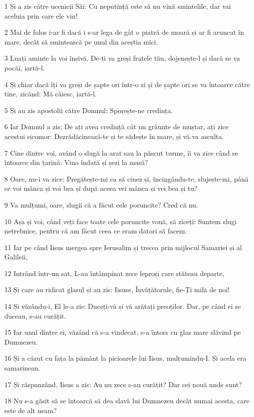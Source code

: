\par 1 Și a zis către ucenicii Săi: Cu neputință este să nu vină smintelile, dar vai aceluia prin care ele vin!
\par 2 Mai de folos i-ar fi dacă i s-ar lega de gât o piatră de moară și ar fi aruncat în mare, decât să smintească pe unul din aceștia mici.
\par 3 Luați aminte la voi înșivă. De-ți va greși fratele tău, dojenește-l și dacă se va pocăi, iartă-l.
\par 4 Și chiar dacă îți va greși de șapte ori într-o zi și de șapte ori se va întoarce către tine, zicând: Mă căiesc, iartă-l.
\par 5 Și au zis apostolii către Domnul: Sporește-ne credința.
\par 6 Iar Domnul a zis: De ați avea credință cât un grăunte de muștar, ați zice acestui sicomor: Dezrădăcinează-te și te sădește în mare, și vă va asculta.
\par 7 Cine dintre voi, având o slugă la arat sau la păscut turme, îi va zice când se întoarce din țarină: Vino îndată și șezi la masă?
\par 8 Oare, nu-i va zice: Pregătește-mi ca să cinez și, încingându-te, slujește-mi, până ce voi mânca și voi bea și după aceea vei mânca și vei bea și tu?
\par 9 Va mulțumi, oare, slugii că a făcut cele poruncite? Cred că nu.
\par 10 Așa și voi, când veți face toate cele poruncite vouă, să ziceți: Suntem slugi netrebnice, pentru că am făcut ceea ce eram datori să facem.
\par 11 Iar pe când Iisus mergea spre Ierusalim și trecea prin mijlocul Samariei și al Galileii,
\par 12 Intrând într-un sat, L-au întâmpinat zece leproși care stăteau departe,
\par 13 Și care au ridicat glasul și au zis: Iisuse, Învățătorule, fie-Ți milă de noi!
\par 14 Și văzându-i, El le-a zis: Duceți-vă și vă arătați preoților. Dar, pe când ei se duceau, s-au curățit.
\par 15 Iar unul dintre ei, văzând că s-a vindecat, s-a întors cu glas mare slăvind pe Dumnezeu.
\par 16 Și a căzut cu fața la pământ la picioarele lui Iisus, mulțumindu-I. Și acela era samarinean.
\par 17 Și răspunzând, Iisus a zis: Au nu zece s-au curățit? Dar cei nouă unde sunt?
\par 18 Nu s-a găsit să se întoarcă să dea slavă lui Dumnezeu decât numai acesta, care este de alt neam?
